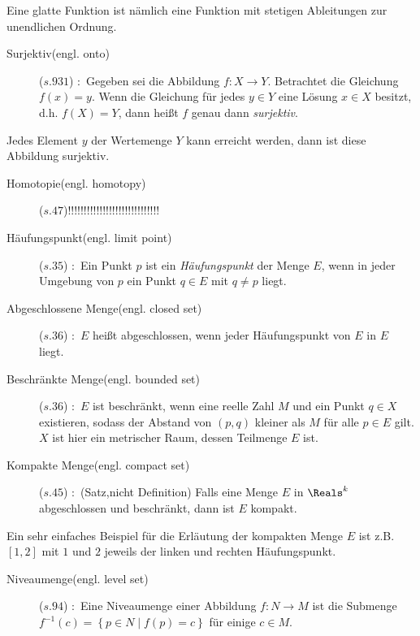 \vspace{-0.8em}
Eine glatte Funktion ist nämlich eine Funktion mit stetigen Ableitungen zur unendlichen Ordnung.
\begin{description}
\item[Surjektiv(engl. onto)]\cite{grosche2003teubner}($s.931$)
:~Gegeben sei die Abbildung $f:X \to Y$. Betrachtet die Gleichung $f\left ( x \right )=y$. Wenn die Gleichung für jedes $y\in Y$ eine Lösung $x\in X$ besitzt, d.h. $f\left ( X \right )=Y$, dann heißt $f$ genau dann \emph{surjektiv}.
\end{description}
\vspace{-0.8em}
Jedes Element $y$ der Wertemenge $Y$ kann erreicht werden, dann ist diese Abbildung surjektiv. 
\begin{description}
\item[Homotopie(engl. homotopy)]\cite{}($s.47$)!!!!!!!!!!!!!!!!!!!!!!!!!!!!!
\end{description}
\vspace{-0.8em}
\begin{description}
\item[Häufungspunkt(engl. limit point)]\cite{rudin2009analysis}($s.35$)
:~Ein Punkt $p$ ist ein \emph{Häufungspunkt} der Menge $E$, wenn in jeder Umgebung von $p$ ein Punkt $q\in E$ mit $q\neq p$ liegt.
\item[Abgeschlossene Menge(engl. closed set)]\cite{rudin2009analysis}($s.36$)
:~$E$ heißt abgeschlossen, wenn jeder Häufungspunkt von $E$ in $E$ liegt.
\item[Beschränkte Menge(engl. bounded set)]\cite{rudin2009analysis}($s.36$)
:~$E$ ist beschränkt, wenn eine reelle Zahl $M$ und ein Punkt $q\in X$ existieren, sodass der Abstand von $(p,q)$ kleiner als $M$ für alle $p\in E$ gilt. $X$ ist hier ein metrischer Raum, dessen Teilmenge $E$ ist.
\item[Kompakte Menge(engl. compact set)]\cite{rudin2009analysis}($s.45$)
:~(Satz,nicht Definition) Falls eine Menge $E$ in $\Reals^{k}$ abgeschlossen und beschränkt, dann ist $E$ kompakt.
\end{description}
\vspace{-0.8em}
Ein sehr einfaches Beispiel für die Erläutung der kompakten Menge $E$ ist z.B. $\left [ 1,2 \right ]$ mit $1$ und $2$ jeweils der linken und rechten Häufungspunkt. %
\begin{description}
\item[Niveaumenge(engl. level set)]\cite{tu2010introduction}($s.94$)
:~Eine Niveaumenge einer Abbildung $f:N \to M$ ist die Submenge $f^{-1}\left ( c \right )= \left \{ p\in N \mid f\left ( p \right )= c\right \}$ für einige $c\in M$.
\end{description}
